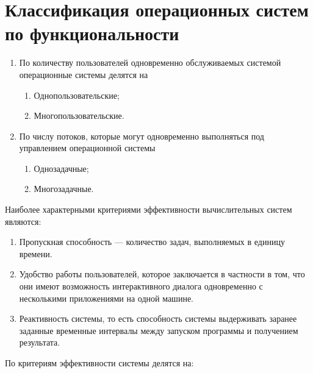 \section{Классификация операционных систем по функциональности}
\begin{enumerate}
	\item По количеству пользователей одновременно обслуживаемых системой
		операционные системы делятся на
		\begin{enumerate}
			\item Однопользовательские;
			\item Многопользовательские.
		\end{enumerate}
	\item По числу потоков, которые могут одновременно выполняться под управлением
		операционной системы
		\begin{enumerate}
			\item Однозадачные;
			\item Многозадачные.
		\end{enumerate}
\end{enumerate}\par
Наиболее характерными критериями эффективности вычислительных систем являются:
\begin{enumerate}
	\item Пропускная способность --- количество задач, выполняемых в единицу
		времени.
	\item Удобство работы пользователей, которое заключается в частности в том,
		что они имеют возможность интерактивного диалога одновременно с несколькими
		приложениями на одной машине.
	\item Реактивность системы, то есть способность системы выдерживать заранее
		заданные временные интервалы между запуском программы и получением
		результата.
\end{enumerate}
По критериям эффективности системы делятся на:
